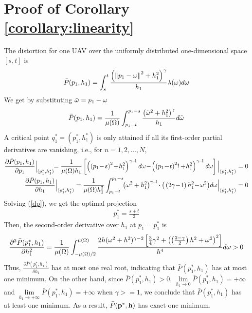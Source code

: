 \documentclass[smallabstract,smallcaptions]{dccpaper}
\newcommand{\df}{\ensuremath{\lam}}         %
\newcommand{\bP}{\ensuremath{\vp}}          %
\newcommand{\abPo}{\ensuremath{\bar{P}}}  %
\newcommand{\bH}{\ensuremath{\vh}}          %
\begin{document}
\section{Proof of Corollary \ref{corollary:linearity}}\label{proof:linearity}
The distortion for one UAV over the uniformly distributed one-dimensional space $[s,t]$ is
\begin{align}
    \abPo(p_1,h_1)= \int_{s}^{t} \frac{\left(\Norm{p_1-\ome}^2 + h^2_1\right)^\gam}{h_1} \df(\ome)d\ome
\end{align}
We get by substituting ${  \tilde{\omega} }=p_1-\omega$
\begin{align}
    \abPo(p_1,h_1)= \frac{1}{\mu(\Omega)}\int_{p_1-t}^{p_1-s} \frac{\left(\tome^2 + h^2_1\right)^{\gam}}{h_1} d\tome
\end{align}
A critical point $q^*_1=\left(p^*_1, h^*_1\right)$ is only attained if all its first-order partial derivatives are vanishing, i.e.,  for  $n=1,2,\dots,N$, 
%
\begin{align}
  \frac{\partial \abPo(p_1,h_1)}{\partial p_1}\Big|_{(p^*_1,h^*_1)}\!\!= \frac{1}{\mu(\Omega)h_1}\left[\left(\left(p_1\!-\!s\right)^2\!+\!h_1^2\right)^{\gam\!-\!1}d\ome\!-\!\left(\left(p_1\!-\!t\right)^2!+\!h_1^2\right)^{\gam\!-\!1}d\ome\right] \Big|_{(p^*_1,h^*_1)} = 0 \label{dp}\\
  \frac{\partial\abPo(p_1,h_1)}{\partial h_1}\Big|_{(p^*_1,h^*_1)} = \frac{1}{\mu(\Omega)h_1^2}\int_{p_1-t}^{p_1-s}\!\!\left(\ome^2 +h_1^2\right)^{\gam\!-\!1}\!\cdot  \big(\left(2\gamma\!-\!1\right)h_1^2\!-\!\ome^2 \big)
  d \ome\Big|_{(p^*_1,h^*_1)} = 0
\label{dh}
\end{align}
Solving (\ref{dp}), we get the optimal projection
\begin{align}
    p^*_1 = \frac{s+t}{2}\label{eq:centroidProjection}
\end{align}
Then, the second-order derivative over $h_1$ at $p_1=p^*_1$ is
\begin{align}
    \frac{\partial^2 \abPo(p^*_1,h_1)}{\partial h^2_1} = \frac{1}{\mu(\Omega)}\int_{-\mu(\Omega)/2}^{\mu(\Omega)}\frac{2h(\ome^2+h^2)^{\gamma-2}\left[\frac{3}{4}\gamma^2+\left(\left(\frac{2-\gamma}{2}\right)h^2+\ome^2\right)^2\right]}{h^4}d\ome > 0
    \label{d2p}
\end{align}
Thus, $\frac{\partial \abPo(p^*_1,h_1)}{\partial h_1}$ has at most one real root, indicating that ${\abPo}(p^*_1,h_1)$ has at most one minimum. 
On the other hand, since ${\abPo}(p^*_1,h_1)>0$, $\lim\limits_{h_1\to0}{\abPo}(p^*_1,h_1)=+\infty$ and  $\lim\limits_{h_1\to+\infty}{\abPo}(p^*_1,h_1)=+\infty$ when $\gamma>=1$, we conclude that ${\abPo}(p^*_1,h_1)$ has at least one minimum.
As a result, ${\abPo}(\bP^*,\bH)$ has exact one minimum.
\end{document}
